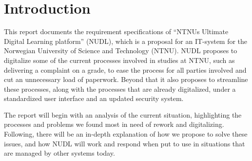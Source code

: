 \section{Introduction}


This report documents the requirement specifications of “NTNUs Ultimate Digital Learning platform” (NUDL), which is a proposal for an IT-system for the Norwegian University of Science and Technology (NTNU). NUDL proposes to digitalize some of the current processes involved in studies at NTNU, such as delivering a complaint on a grade, to ease the process for all parties involved and cut an unnecessary load of paperwork. Beyond that it also proposes to streamline these processes, along with the processes that are already digitalized, under a standardized user interface and an updated security system.

\noindent
The report will begin with an analysis of the current situation, highlighting the processes and problems we found most in need of rework and digitalizing. Following, there will be an in-depth explanation of how we propose to solve these issues, and how NUDL will work and respond when put to use in situations that are managed by other systems today.
